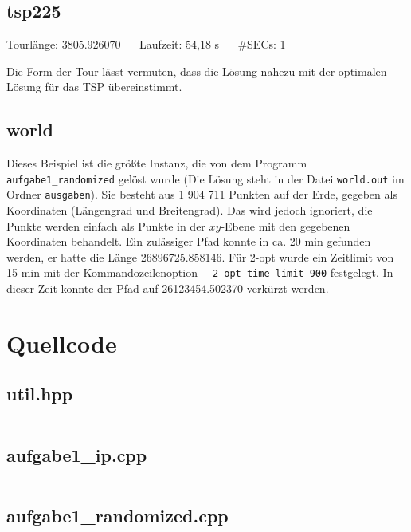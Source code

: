 \documentclass[a4paper, 10pt, ngerman]{article}
\begin{document}
\subsection{tsp225}



\noindent Tourlänge: 3805.926070 $\quad$ Laufzeit: 54,18 s $\quad$ \#SECs: 1
\medskip

\noindent Die Form der Tour lässt vermuten, dass die Lösung nahezu mit der optimalen Lösung für das TSP übereinstimmt.

\subsection{world}

Dieses Beispiel ist die größte Instanz, die von dem Programm \verb|aufgabe1_randomized| gelöst wurde (Die Lösung steht in der Datei \verb|world.out| im Ordner \verb|ausgaben|). Sie besteht aus 1 904 711 Punkten auf der Erde, gegeben als Koordinaten (Längengrad und Breitengrad). Das wird jedoch ignoriert, die Punkte werden einfach als Punkte in der $xy$-Ebene mit den gegebenen Koordinaten behandelt. Ein zulässiger Pfad konnte in ca. 20 min gefunden werden, er hatte die Länge 26896725.858146. Für 2-opt wurde ein Zeitlimit von 15 min mit der Kommandozeilenoption \verb|--2-opt-time-limit 900| festgelegt. In dieser Zeit konnte der Pfad auf 26123454.502370 verkürzt werden.

\section{Quellcode}

\subsection{util.hpp}

\inputminted{c++}{aufgabe1/util.hpp}

\subsection{aufgabe1\_ip.cpp}

\inputminted{c++}{aufgabe1/aufgabe1_ip.cpp}

\subsection{aufgabe1\_randomized.cpp}
\end{document}
